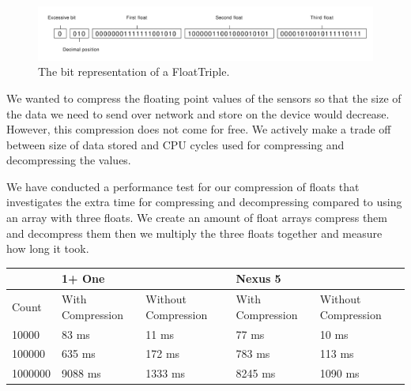 \begin{figure}[!htbp]
    \centering
    \includegraphics[width=\textwidth]{graphic/data_modeling/float_triple_bit.pdf}
    \caption{The bit representation of a FloatTriple.}
    \label{fig:float_triple_bit}
\end{figure}
We wanted to compress the floating point values of the sensors so that the size of the data we need to send over network and store on the device would decrease. However, this compression does not come for free. We actively make a trade off between size of data stored and CPU cycles used for compressing and decompressing the values.  

We have conducted a performance test for our compression of floats that investigates the extra time for compressing and decompressing compared to using an array with three floats. We create an amount of float arrays compress them and decompress them then we multiply the three floats together and measure how long it took.

\begin{table}[!htbp]
    \centering
    \begin{tabular}{ | m{} | m{} | m{} | m{} | m{} | }
    \hline
    ~       & 1+ One           & ~                   & Nexus 5          & ~                   \\ \hline
    Count   & With Compression & Without Compression & With Compression & Without Compression \\ \hline
    10000   & 83 ms            & 11 ms               & 77 ms            & 10 ms               \\ \hline
    100000  & 635 ms           & 172 ms              & 783 ms           &  113 ms             \\ \hline
    1000000 & 9088 ms          & 1333 ms             & 8245 ms          & 1090 ms             \\ \hline
    \end{tabular}
\end{table}
\FloatBarrier

